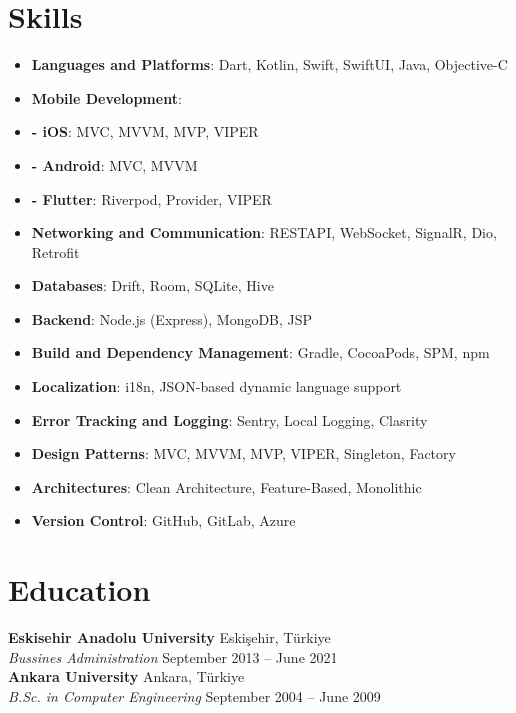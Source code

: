 \documentclass[10pt,a4paper]{extarticle}
\begin{document}
\section{Skills}
\begin{itemize}[leftmargin=*,noitemsep,topsep=0pt]
	\item \textbf{Languages and Platforms}: Dart, Kotlin, Swift, SwiftUI, Java, Objective-C
	\item \textbf{Mobile Development}: 
 	\item \textbf{- iOS}: MVC, MVVM, MVP, VIPER
  	\item \textbf{- Android}: MVC, MVVM
  	\item \textbf{- Flutter}: Riverpod, Provider, VIPER
	\item \textbf{Networking and Communication}: RESTAPI, WebSocket, SignalR, Dio, Retrofit
	\item \textbf{Databases}: Drift, Room, SQLite, Hive
	\item \textbf{Backend}: Node.js (Express), MongoDB, JSP
	\item \textbf{Build and Dependency Management}: Gradle, CocoaPods, SPM, npm
	\item \textbf{Localization}: i18n, JSON-based dynamic language support
	\item \textbf{Error Tracking and Logging}: Sentry, Local Logging, Clasrity
	\item \textbf{Design Patterns}: MVC, MVVM, MVP, VIPER, Singleton, Factory
	\item \textbf{Architectures}: Clean Architecture, Feature-Based, Monolithic
	\item \textbf{Version Control}: GitHub, GitLab, Azure
\end{itemize}
\section{Education}
\textbf{Eskisehir Anadolu University} \hfill Eskişehir, Türkiye\\
\textit{Bussines Administration} \hfill September 2013 -- June 2021\\
\textbf{Ankara University} \hfill Ankara, Türkiye\\
\textit{B.Sc. in Computer Engineering} \hfill September 2004 -- June 2009\\
\end{document}
